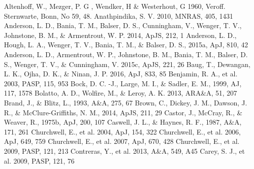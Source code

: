 \documentclass[onecolumn]{pasj01}
\begin{document}
{{{{{{%
\begin{thebibliography}{}
Altenhoff, W., Mezger, P. G , Wendker, H \& Westerhout, G 1960, Veroff. Sternwarte, Bonn, No 59, 48.
Anathpindika, S. V. 2010, MNRAS, 405, 1431
Anderson, L. D., Bania, T. M., Balser, D. S., Cunningham, V., Wenger, T. V., Johnstone, B. M., \& Armentrout, W. P. 2014, ApJS, 212, 1
Anderson, L. D., Hough, L. A., Wenger, T. V., Bania, T. M., \& Balser, D. S., 2015a, ApJ, 810, 42
Anderson, L. D., Armentrout, W. P., Johnstone, B. M., Bania, T. M., Balser, D. S., Wenger, T. V.,  \& Cunningham, V. 2015c, ApJS, 221, 26
Baug, T., Dewangan, L. K., Ojha, D. K., \& Ninan, J. P. 2016, ApJ, 833, 85
Benjamin, R. A., et al. 2003, PASP, 115, 953
{Bock, D. C. -J.,  Large, M. I., \& Sadler, E. M., 1999, AJ, 117, 1578}
{Bolatto, A. D., Wolfire, M., \& Leroy, A. K. 2013, ARA\&A, 51, 207}
{Brand, J., \& Blitz, L., 1993, A\&A, 275, 67 }
Brown, C., Dickey, J. M., Dawson, J. R., \& McClure-Griffiths, N. M., 2014, ApJS, 211, 29
Castor, J., McCray, R., \& Weaver, R., 1975b, ApJ, 200, 107
{Caswell, J. L., \& Haynes, R. F., 1987, A\&A, 171, 261}
{Churchwell, E., et al. 2004, ApJ, 154, 322}
Churchwell, E., et al. 2006, ApJ, 649, 759
{Churchwell, E., et al. 2007, ApJ, 670, 428}
{Churchwell, E., et al. 2009, PASP, 121, 213}
Contreras, Y., et al. 2013, A\&A, 549, A45
Carey, S. J., et al. 2009, PASP, 121, 76

\end{thebibliography}}}}}}}
\end{document}
